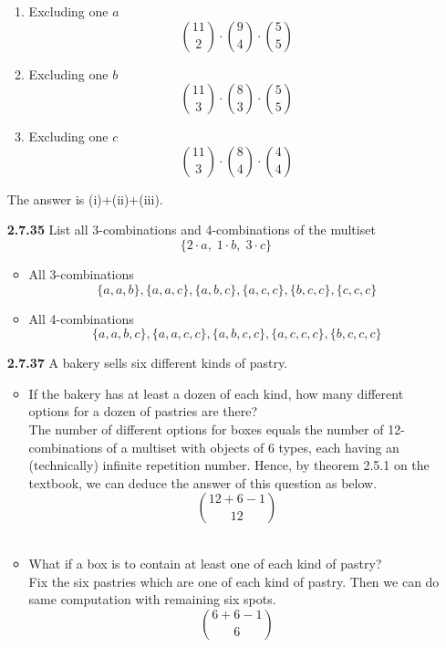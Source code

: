 \documentclass[12pt]{article}
\begin{document}
\begin{itemize}
    \begin{enumerate}[label=(\roman*)]
        \item Excluding one $a$
        $$\binom{11}{2}\cdot\binom{9}{4}\cdot\binom{5}{5}$$
        
        \item Excluding one $b$
        $$\binom{11}{3}\cdot\binom{8}{3}\cdot\binom{5}{5}$$
        
        \item Excluding one $c$
        $$\binom{11}{3}\cdot\binom{8}{4}\cdot\binom{4}{4}$$
    \end{enumerate}
    
    The answer is (i)+(ii)+(iii).\\
    
    \item[\bf 2.7.35] List all 3-combinations and 4-combinations of the multiset 
    $$\{2\cdot a,\; 1\cdot b,\; 3\cdot c\}$$
    
    \begin{itemize}
        \item All 3-combinations
        $$\{a,a,b\},\{a,a,c\},\{a,b,c\},\{a,c,c\},\{b,c,c\},\{c,c,c\}$$
        \item All 4-combinations
        $$\{a,a,b,c\},\{a,a,c,c\},\{a,b,c,c\},\{a,c,c,c\},\{b,c,c,c\}$$
    \end{itemize}
    
    \item[\bf 2.7.37] A bakery sells six different kinds of pastry.
    \begin{itemize}
        \item If the bakery has at least a dozen of each kind, how many different options for a dozen of pastries are there?\\
        
        The number of different options for boxes equals the number of 12-combinations of a multiset with objects of 6 types, each having an (technically) infinite repetition number. Hence, by theorem 2.5.1 on the textbook, we can deduce the answer of this question as below.
        $$\binom{12+6-1}{12}$$\\
        
        \item What if a box is to contain at least one of each kind of pastry?\\
        
        Fix the six pastries which are one of each kind of pastry. Then we can do same computation with remaining six spots.
        $$\binom{6+6-1}{6}$$
    \end{itemize} 
    

\end{itemize}
\end{document}
